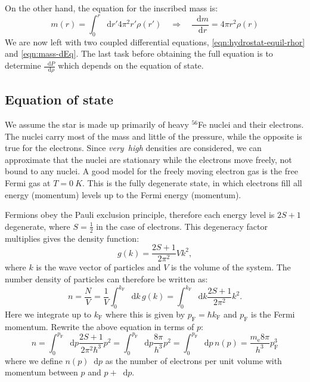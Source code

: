 \documentclass[]{article}
\newcommand{\dd}{\mathop{}\!\mathrm{d}}
\newcommand{\fermiMtm}{p_\mathrm{F}}
\newcommand{\massElectron}{m_\mathrm{e}}
\begin{document}
	On the other hand, the equation for the inscribed mass is:
	\begin{equation}\label{eqn:mass-dEq}
		m(r) = \int_0^r \dd r' 4 \pi^2 r' \rho\left(r'\right) \quad \Rightarrow \quad \frac{\dd m}{\dd r} = 4 \pi r^2 \rho(r)
	\end{equation}
	We are now left with two coupled differential equations, \eqref{eqn:hydrostat-equil-rhor} and \eqref{eqn:mass-dEq}. The last task before obtaining the full equation is to determine $\frac{\dd P}{\dd \rho}$ which depends on the equation of state.

\subsection{Equation of state}
	We assume the star is made up primarily of heavy $^{56}$Fe nuclei and their electrons. The nuclei carry most of the mass and little of the pressure, while the opposite is true for the electrons. Since \emph{very~high} densities are considered, we can approximate that the nuclei are stationary while the electrons move freely, not bound to any nuclei. A good model for the freely moving electron gas is the free Fermi gas at $T = \SI{0}{K}$. This is the fully degenerate state, in which electrons fill all energy (momentum) levels up to the Fermi energy (momentum).

	Fermions obey the Pauli exclusion principle, therefore each energy level is $2S + 1$ degenerate, where $S = \frac{1}{2}$ in the case of electrons. This degeneracy factor multiplies gives the density function:
	\begin{equation}
		g(k) = \frac{2S + 1}{2 \pi^2} V k^2,
	\end{equation}
	where $k$ is the wave vector of particles and $V$ is the volume of the system. The number density of particles can therefore be written as:
	\begin{equation}
		n = \frac{N}{V} = \frac{1}{V} \int_0^{k_\mathrm{F}} \dd k \, g(k) = \int_0^{k_\mathrm{F}} \dd k \frac{2S + 1}{2 \pi^2} k^2.
	\end{equation}
	Here we integrate up to $k_\mathrm{F}$ where this is given by $\fermiMtm = \hbar k_\mathrm{F}$ and $\fermiMtm$ is the Fermi momentum. Rewrite the above equation in terms of $p$:
	\begin{equation}\label{eqn:number-density}
		n = \int_0^{\fermiMtm} \dd p \frac{2S + 1}{2 \pi^2 \hbar^3} p^2 = \int_0^{\fermiMtm} \dd p \frac{8 \pi}{h^3} p^2 = \int_0^{\fermiMtm} \dd p \, n(p) = \frac{\massElectron8 \pi}{h^3} \fermiMtm^3
	\end{equation}
	where we define $n(p) \dd p$ as the number of electrons per unit volume with momentum between $p$ and $p + \dd p$.
\end{document}
